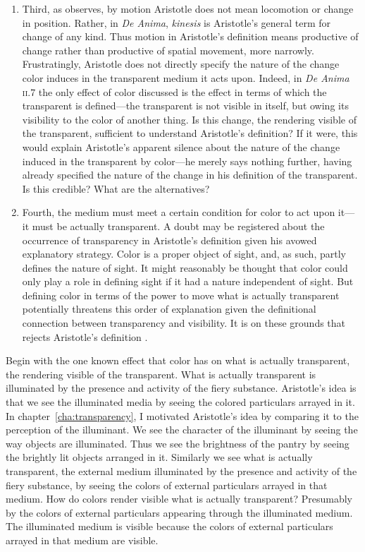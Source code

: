 \begin{enumerate}[(1)]
\item Third, as \citet[367]{Hicks:1907uq} observes, by motion Aristotle does not mean locomotion or change in position. Rather, in \emph{De Anima}, \emph{kinesis} is Aristotle's general term for change of any kind. Thus motion in Aristotle's definition means productive of change rather than productive of spatial movement, more narrowly. Frustratingly, Aristotle does not directly specify the nature of the change color induces in the transparent medium it acts upon. Indeed, in \emph{De Anima} \textsc{ii}.7 the only effect of color discussed is the effect in terms of which the transparent is defined---the transparent is not visible in itself, but owing its visibility to the color of another thing. Is this change, the rendering visible of the transparent, sufficient to understand Aristotle's definition? If it were, this would explain Aristotle's apparent silence about the nature of the change induced in the transparent by color---he merely says nothing further, having already specified the nature of the change in his definition of the transparent. Is this credible? What are the alternatives?
\item Fourth, the medium must meet a certain condition for color to act upon it---it must be actually transparent. A doubt may be registered about the occurrence of transparency in Aristotle's definition given his avowed explanatory strategy. Color is a proper object of sight, and, as such, partly defines the nature of sight. It might reasonably be thought that color could only play a role in defining sight if it had a nature independent of sight. But defining color in terms of the power to move what is actually transparent potentially threatens this order of explanation given the definitional connection between transparency and visibility. It is on these grounds that \citet{Zabarella:1605kx} rejects Aristotle's definition \citep[see][for discussion]{Broackes:1999uq}.
\end{enumerate}

Begin with the one known effect that color has on what is actually transparent, the rendering visible of the transparent. What is actually transparent is illuminated by the presence and activity of the fiery substance. Aristotle's idea is that we see the illuminated media by seeing the colored particulars arrayed in it. In chapter~\ref{cha:transparency}, I motivated Aristotle's idea by comparing it to the perception of the illuminant. We see the character of the illuminant by seeing the way objects are illuminated. Thus we see the brightness of the pantry by seeing the brightly lit objects arranged in it. Similarly we see what is actually transparent, the external medium illuminated by the presence and activity of the fiery substance, by seeing the colors of external particulars arrayed in that medium. How do colors render visible what is actually transparent? Presumably by the colors of external particulars appearing through the illuminated medium. The illuminated medium is visible because the colors of external particulars arrayed in that medium are visible. 

